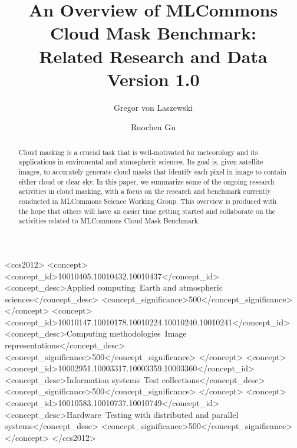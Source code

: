 \documentclass[sigplan,screen]{acmart}
\begin{document}
\newcommand{\TITLE}{An Overview of MLCommons Cloud Mask Benchmark: \\ Related Research and Data \\ {\normalsize Version 1.0}}

\title[Overview of MLCommons Cloud Mask: Related Research]{\TITLE}

\author{Gregor von Laszewski}

\author{Ruochen Gu}

\renewcommand{\shortauthors}{von Laszewski et al.}

\begin{abstract}

Cloud masking is a crucial task that is well-motivated for meteorology and its applications in environental and atmospheric sciences. Its goal is, given satellite images, to accurately generate cloud masks that identify each pixel in image to contain either cloud or clear sky. 
In this paper, we summarize some of the ongoing research activities in cloud masking, with a focus on the research and benchmark currently conducted in MLCommons Science Working Group.
This overview is produced with the hope that others will have an easier time getting started and collaborate on the activities related to MLCommons Cloud Mask Benchmark.

\end{abstract}

\begin{CCSXML}
<ccs2012>
<concept>
<concept_id>10010405.10010432.10010437</concept_id>
<concept_desc>Applied computing~Earth and atmospheric sciences</concept_desc>
<concept_significance>500</concept_significance>
</concept>
<concept>
<concept_id>10010147.10010178.10010224.10010240.10010241</concept_id>
<concept_desc>Computing methodologies~Image representations</concept_desc>
<concept_significance>500</concept_significance>
</concept>
<concept>
<concept_id>10002951.10003317.10003359.10003360</concept_id>
<concept_desc>Information systems~Test collections</concept_desc>
<concept_significance>500</concept_significance>
</concept>
<concept>
<concept_id>10010583.10010737.10010749</concept_id>
<concept_desc>Hardware~Testing with distributed and parallel systems</concept_desc>
<concept_significance>500</concept_significance>
</concept>
</ccs2012>
\end{CCSXML}
\end{document}
